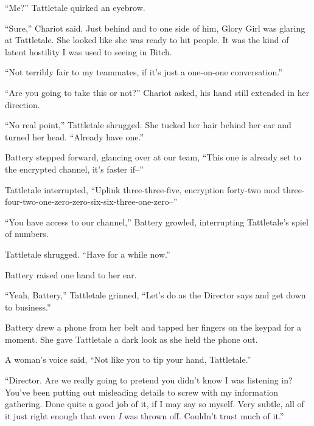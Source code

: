 





``Me?''  Tattletale quirked an eyebrow.



``Sure,'' Chariot said.  Just behind and to one side of him, Glory Girl was glaring at Tattletale.  She looked like she was ready to hit people.  It was the kind of latent hostility I was used to seeing in Bitch.



``Not terribly fair to my teammates, if it's just a one-on-one conversation.''



``Are you going to take this or not?'' Chariot asked, his hand still extended in her direction.



``No real point,'' Tattletale shrugged.  She tucked her hair behind her ear and turned her head.  ``Already have one.''



Battery stepped forward, glancing over at our team, ``This one is already set to the encrypted channel, it's faster if--''



Tattletale interrupted, ``Uplink three-three-five, encryption forty-two mod three-four-two-one-zero-zero-six-six-three-one-zero--''



``You have access to our channel,'' Battery growled, interrupting Tattletale's spiel of numbers.



Tattletale shrugged.  ``Have for a while now.''



Battery raised one hand to her ear.



``Yeah, Battery,'' Tattletale grinned, ``Let's do as the Director says and get down to business.''



Battery drew a phone from her belt and tapped her fingers on the keypad for a moment.  She gave Tattletale a dark look as she held the phone out.



A woman's voice said, ``Not like you to tip your hand, Tattletale.''



``Director.  Are we really going to pretend you didn't know I was listening in?  You've been putting out misleading details to screw with my information gathering.  Done quite a good job of it, if I may say so myself.  Very subtle, all of it just right enough that even \emph{I} was thrown off.  Couldn't trust much of it.''



